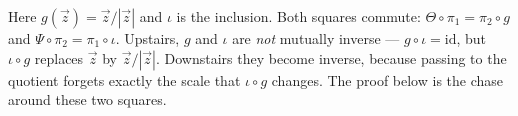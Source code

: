 \documentclass[11pt]{report}
\begin{document}
\begin{center}
\end{center}

Here $g(\vec z) = \vec z/|\vec z|$ and $\iota$ is the inclusion. Both squares commute: $\Theta \circ \pi_1 = \pi_2 \circ g$ and $\Psi \circ \pi_2 = \pi_1 \circ \iota$. Upstairs, $g$ and $\iota$ are \emph{not} mutually inverse --- $g \circ \iota = \mathrm{id}$, but $\iota \circ g$ replaces $\vec z$ by $\vec z/|\vec z|$. Downstairs they become inverse, because passing to the quotient forgets exactly the scale that $\iota \circ g$ changes. The proof below is the chase around these two squares.
\end{document}
